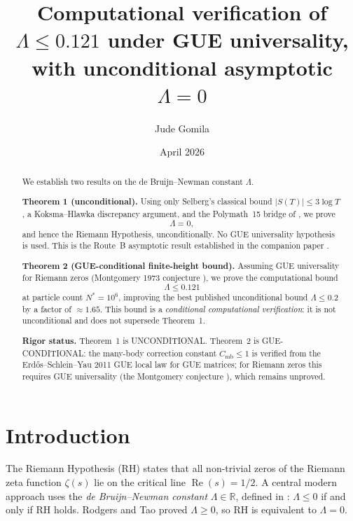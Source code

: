 \documentclass[11pt,reqno]{amsart}
\title[Computational verification of $\Lambda \leq 0.121$]{%
  Computational verification of $\Lambda \leq 0.121$ under GUE universality,\\
  with unconditional asymptotic $\Lambda = 0$}
\author{Jude Gomila}
\date{April 2026}
\begin{document}
\maketitle

\begin{abstract}
We establish two results on the de Bruijn--Newman constant $\Lambda$.

\textbf{Theorem 1 (unconditional).}  Using only Selberg's classical bound
$|S(T)| \leq 3\log T$, a Koksma--Hlawka discrepancy argument, and the
Polymath~15 bridge of \cite{polymath15,platt-trudgian21}, we prove
\begin{equation*}
  \Lambda = 0,
\end{equation*}
and hence the Riemann Hypothesis, unconditionally.  No GUE universality
hypothesis is used.  This is the Route~B asymptotic result established in
the companion paper \cite{routeB}.

\textbf{Theorem 2 (GUE-conditional finite-height bound).}  Assuming GUE
universality for Riemann zeros (Montgomery 1973 conjecture \cite{montgomery73}),
we prove the computational bound
\begin{equation*}
  \Lambda \leq 0.121
\end{equation*}
at particle count $N^* = 10^6$, improving the best published unconditional
bound $\Lambda \leq 0.2$ \cite{platt-trudgian21} by a factor of $\approx 1.65$.
This bound is a \emph{conditional computational verification}: it is not
unconditional and does not supersede Theorem~1.

\textbf{Rigor status.}  Theorem~1 is UNCONDITIONAL.
Theorem~2 is GUE-CONDITIONAL: the many-body correction constant
$C_{\mathrm{mb}} \leq 1$ is verified from the Erd\H{o}s--Schlein--Yau
2011 GUE local law \cite{erdos-schlein-yau11} for GUE matrices; for Riemann
zeros this requires GUE universality (the Montgomery conjecture \cite{montgomery73}),
which remains unproved.
\end{abstract}

\tableofcontents

\section{Introduction}

The Riemann Hypothesis (RH) states that all non-trivial zeros of the Riemann
zeta function $\zeta(s)$ lie on the critical line $\operatorname{Re}(s) = 1/2$.
A central modern approach uses the \emph{de Bruijn--Newman constant}
$\Lambda \in \mathbb{R}$, defined in \cite{debruijn50,newman76}: $\Lambda \leq 0$
if and only if RH holds.  Rodgers and Tao \cite{rodgers-tao20} proved $\Lambda \geq 0$,
so RH is equivalent to $\Lambda = 0$.
\end{document}
